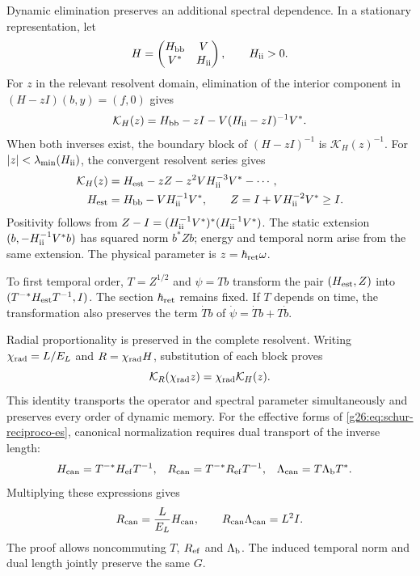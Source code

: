 Dynamic elimination preserves an additional spectral dependence. In a stationary representation, let
\[
 H=\begin{pmatrix}H_{\rm bb}&V\\V^*&H_{\rm ii}\end{pmatrix},
 \qquad H_{\rm ii}>0.
\]
For \(z\) in the relevant resolvent domain, elimination of the interior component in \((H-zI)(b,y)=(f,0)\) gives
\begin{equation}
 \mathcal K_H(z)=H_{\rm bb}-zI
       -V(H_{\rm ii}-zI)^{-1}V^*.
 \label{g26:eq:resolvente-memoria-es}
\end{equation}
When both inverses exist, the boundary block of \((H-zI)^{-1}\) is \(\mathcal K_H(z)^{-1}\). For \(|z|<\lambda_{\min}(H_{\rm ii})\), the convergent resolvent series gives
\begin{align}
 \mathcal K_H(z)&=H_{\rm est}-zZ-z^2VH_{\rm ii}^{-3}V^*-\cdots,
 \label{g26:eq:expansion-resolvente-es}\\
 H_{\rm est}&=H_{\rm bb}-VH_{\rm ii}^{-1}V^*,\qquad
 Z=I+VH_{\rm ii}^{-2}V^*\geq I.
 \label{g26:eq:norma-z-es}
\end{align}
Positivity follows from \(Z-I=(H_{\rm ii}^{-1}V^*)^*(H_{\rm ii}^{-1}V^*)\). The static extension \((b,-H_{\rm ii}^{-1}V^*b)\) has squared norm \(b^*Zb\); energy and temporal norm arise from the same extension. The physical parameter is \(z=\hbar_{\rm ret}\omega\).

To first temporal order, \(T=Z^{1/2}\) and \(\psi=Tb\) transform the pair \((H_{\rm est},Z)\) into \((T^{-*}H_{\rm est}T^{-1},I)\). The section \(\hbar_{\rm ret}\) remains fixed. If \(T\) depends on time, the transformation also preserves the term \(\dot T b\) of \(\dot\psi=\dot T b+T\dot b\).

Radial proportionality is preserved in the complete resolvent. Writing \(\chi_{\rm rad}=L/E_{L}\) and \(R=\chi_{\rm rad} H\), substitution of each block proves
\begin{equation}
 \mathcal K_R(\chi_{\rm rad} z)=\chi_{\rm rad}\mathcal K_H(z).
 \label{g26:eq:resolvente-proporcional-es}
\end{equation}
This identity transports the operator and spectral parameter simultaneously and preserves every order of dynamic memory. For the effective forms of \eqref{g26:eq:schur-reciproco-es}, canonical normalization requires dual transport of the inverse length:
\begin{align*}
 H_{\rm can}&=T^{-*}H_{\rm ef}T^{-1},&
 R_{\rm can}&=T^{-*}R_{\rm ef}T^{-1},&
 \Lambda_{\rm can}&=T\Lambda_{\rm b}T^*.
\end{align*}
Multiplying these expressions gives
\[
 R_{\rm can}=\frac{L}{E_{L}}H_{\rm can},\qquad
 R_{\rm can}\Lambda_{\rm can}=L^2I.
\]
The proof allows noncommuting \(T\), \(R_{\rm ef}\) and \(\Lambda_{\rm b}\). The induced temporal norm and dual length jointly preserve the same \(G\).


